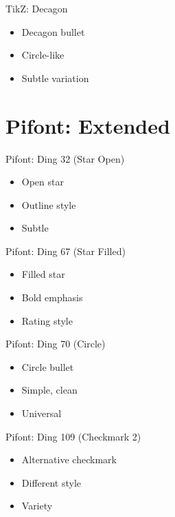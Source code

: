 \documentclass[12pt]{beamer}
\begin{document}
\begin{frame}{TikZ: Decagon}
\begin{itemize}
  \item Decagon bullet
  \item Circle-like
  \item Subtle variation
\end{itemize}
\end{frame}

\section{Pifont: Extended}

\begin{frame}{Pifont: Ding 32 (Star Open)}
\begin{itemize}
  \item Open star
  \item Outline style
  \item Subtle
\end{itemize}
\end{frame}

\begin{frame}{Pifont: Ding 67 (Star Filled)}
\begin{itemize}
  \item Filled star
  \item Bold emphasis
  \item Rating style
\end{itemize}
\end{frame}

\begin{frame}{Pifont: Ding 70 (Circle)}
\begin{itemize}
  \item Circle bullet
  \item Simple, clean
  \item Universal
\end{itemize}
\end{frame}

\begin{frame}{Pifont: Ding 109 (Checkmark 2)}
\begin{itemize}
  \item Alternative checkmark
  \item Different style
  \item Variety
\end{itemize}
\end{frame}
\end{document}
